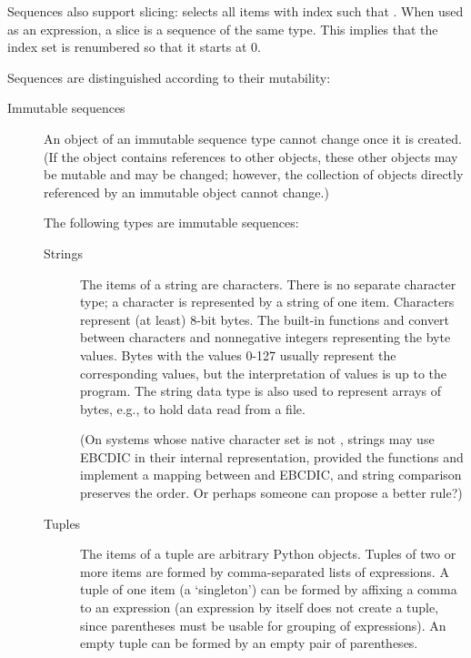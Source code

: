 \begin{description}
Sequences also support slicing: 
selects all items with index  such that  \code{<=}
 \code{<} .  When used as an expression, a slice is a
sequence of the same type.  This implies that the index set is
renumbered so that it starts at 0.

Sequences are distinguished according to their mutability:

\begin{description}
%
\item[Immutable sequences]
An object of an immutable sequence type cannot change once it is
created.  (If the object contains references to other objects,
these other objects may be mutable and may be changed; however,
the collection of objects directly referenced by an immutable object
cannot change.)

The following types are immutable sequences:

\begin{description}

\item[Strings]
The items of a string are characters.  There is no separate
character type; a character is represented by a string of one item.
Characters represent (at least) 8-bit bytes.  The built-in
functions  and
 convert between characters and
nonnegative integers representing the byte values.  Bytes with the
values 0-127 usually represent the corresponding \ASCII{} values, but
the interpretation of values is up to the program.  The string
data type is also used to represent arrays of bytes, e.g., to hold data
read from a file.

(On systems whose native character set is not \ASCII{}, strings may use
EBCDIC in their internal representation, provided the functions
 and  implement a mapping between \ASCII{} and
EBCDIC, and string comparison preserves the \ASCII{} order.
Or perhaps someone can propose a better rule?)

\item[Tuples]
The items of a tuple are arbitrary Python objects.
Tuples of two or more items are formed by comma-separated lists
of expressions.  A tuple of one item (a `singleton') can be formed
by affixing a comma to an expression (an expression by itself does
not create a tuple, since parentheses must be usable for grouping of
expressions).  An empty tuple can be formed by an empty pair of
parentheses.


\end{description}
\end{description}
\end{description}
